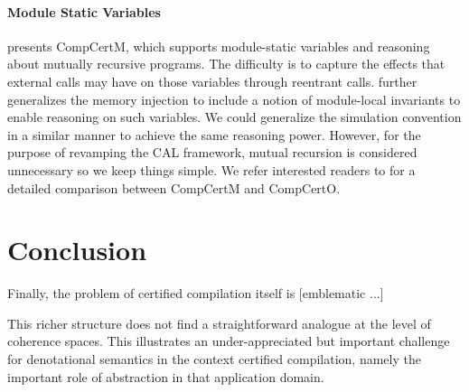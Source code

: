 \documentclass[acmsmall,screen,review,anonymous]{acmart}
\begin{document}
\paragraph{Module Static Variables}

\citet{compcertm} presents CompCertM,
which supports module-static variables
and reasoning about mutually recursive programs.
The difficulty is to capture the effects that external calls may have on
those variables through reentrant calls.
\citet{compcertm} further generalizes the memory injection
to include a notion of module-local invariants
to enable reasoning on such variables.
We could generalize the simulation convention in a similar manner
to achieve the same reasoning power.
However, for the purpose of revamping the CAL framework,
mutual recursion is considered unnecessary
so we keep things simple.
We refer interested readers to \citet{compcerto}
for a detailed comparison between CompCertM and CompCertO.


\section{Conclusion} %

Finally,
the problem of certified compilation itself
is [emblematic ...]

This richer structure
does not find a straightforward analogue
at the level of coherence spaces.
This illustrates an under-appreciated but important challenge
for denotational semantics in the context certified compilation,
namely the important role of abstraction
in that application domain.




\appendix

\newpage
\end{document}
